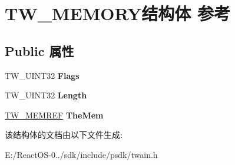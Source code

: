\hypertarget{struct_t_w___m_e_m_o_r_y}{}\section{T\+W\+\_\+\+M\+E\+M\+O\+R\+Y结构体 参考}
\label{struct_t_w___m_e_m_o_r_y}
\subsection*{Public 属性}
\begin{DoxyCompactItemize}
\item 
\mbox{\label{struct_t_w___m_e_m_o_r_y_a615800fbf8c4b437e41974a54dff9d29}} 
T\+W\+\_\+\+U\+I\+N\+T32 {\bfseries Flags}
\item 
\mbox{\label{struct_t_w___m_e_m_o_r_y_a4008afa936847e4683631d82431fc0fe}} 
T\+W\+\_\+\+U\+I\+N\+T32 {\bfseries Length}
\item 
\mbox{\label{struct_t_w___m_e_m_o_r_y_a2b8347e980ea451cc2d7b3db89cab5e5}} 
\hyperlink{interfacevoid}{T\+W\+\_\+\+M\+E\+M\+R\+EF} {\bfseries The\+Mem}
\end{DoxyCompactItemize}


该结构体的文档由以下文件生成\+:\begin{DoxyCompactItemize}
\item 
E\+:/\+React\+O\+S-\/0../sdk/include/psdk/twain.\+h\end{DoxyCompactItemize}
